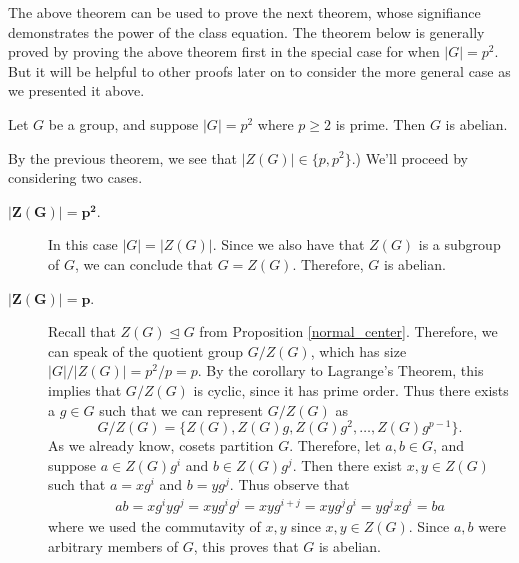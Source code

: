 \documentclass[12pt,letterpaper]{algebra_book}
\newcommand{\normal}{\unlhd}
\theoremstyle{definition}
\begin{document}
    The above theorem can be used to prove the next theorem, whose
    signifiance demonstrates the power of the class equation.
    The theorem below is generally
        proved by proving the above theorem first in the special case
        for when $|G| = p^2$. But it will be helpful to other proofs
        later on to consider the more general case as we presented it above.

    \begin{thm}
        Let $G$ be a group, and suppose $|G| = p^2$ where $p \ge 2$ is
        prime. Then $G$ is abelian. 
    \end{thm}

    \begin{prf}
        \textcolor{green!50!black}{By the previous theorem, we see
        that $|Z(G)| \in \{p, p^2\}$.)} We'll proceed by considering two cases.

        \begin{description}
            \item[$\mathbf{|Z(G)| = p^2}$.] 
            In this case $|G| = |Z(G)|$. Since we also have that
            $Z(G)$ is a subgroup of $G$, we can conclude that $G =
            Z(G)$. 
            Therefore, $G$ is abelian. 
             
            \item[$\mathbf{|Z(G)| = p}$.] 
            Recall that $Z(G) \normal
            G$ from Proposition \ref{normal_center}. Therefore, we can
            speak of the quotient group $G/Z(G)$, which has size
            $|G|/|Z(G)| = p^2/p = p$. By the corollary to Lagrange's
            Theorem, this implies that $G/Z(G)$ is cyclic, since it
            has prime order. Thus there
            exists a $g \in G$ such that we can represent $G/Z(G)$ as 
            \[
                G/Z(G) = \{Z(G), Z(G)g, Z(G)g^2, \dots, Z(G)g^{p-1}\}.
            \]
            As we already know, cosets partition $G$. Therefore, let
            $a, b \in G$, and suppose $a \in Z(G)g^i$ and $b \in
            Z(G)g^j$. Then there exist $x, y \in Z(G)$ such that 
            $a = xg^i$ and $b = yg^j$. Thus observe that 
            \begin{align*}
                ab = xg^i yg^j = xyg^ig^j = xyg^{i+j} = xyg^jg^i
                = yg^jxg^i = ba
            \end{align*}
            where we used the commutavity of $x,y$ since $x, y \in
            Z(G)$. Since $a, b$ were arbitrary members of $G$, this
            proves that $G$ is abelian.
        \end{description}
    \end{prf}
\end{document}
